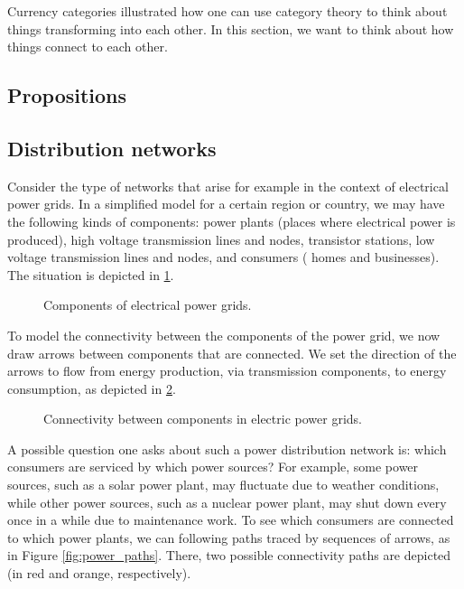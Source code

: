
Currency categories illustrated how one can use category theory to think about things transforming into each other. In this section, we want to think about how things connect to each other.


\subsection{Propositions}


\subsection{Distribution networks}

Consider the type of networks that arise for example in the context of electrical power grids. In a simplified model for a certain region or country, we may have the following kinds of components: power plants (places where electrical power is produced), high voltage transmission lines and nodes, transistor stations, low voltage transmission lines and nodes, and consumers ( homes and businesses). The situation is depicted in \cref{fig:power_nodes}.

\begin{figure}[h!]
\centering
 \caption{Components of electrical power grids.}
\label{fig:power_nodes}
\end{figure}
To model the connectivity between the components of the power grid, we now draw arrows between components that are connected. We set the direction of the arrows to flow from energy production, via transmission components, to energy consumption, as depicted in \cref{fig:power_nodes_connected}.
\begin{figure}[h!]
\centering
{}
 \caption{Connectivity between components in electric power grids.}
\label{fig:power_nodes_connected}
\end{figure}


A possible question one asks about such a power distribution network is: which consumers are serviced by which power sources? For example, some power sources, such as a solar power plant, may fluctuate due to weather conditions, while other power sources, such as a nuclear power plant, may shut down every once in a while due to maintenance work. To see which consumers are connected to which power plants, we can following paths traced by sequences of arrows, as in Figure \cref{fig:power_paths}. There, two possible connectivity paths are depicted (in red and orange, respectively).


